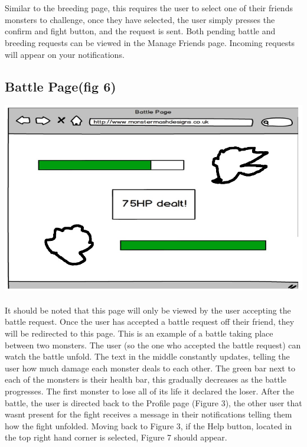 \documentclass{project}
\begin{document}
\\
\\
Similar to the breeding page, this requires the user to select one of their friends
monsters to challenge, once they have selected, the user simply presses the confirm
and fight button, and the request is sent.
Both pending battle and breeding requests can be viewed in the Manage Friends
page. Incoming requests will appear on your notifications.

\subsection{Battle Page(fig 6)}
\includegraphics[scale=0.5]{battle.jpg}
\\
\\
It should be noted that this page will only be viewed by the user accepting the battle
request. Once the user has accepted a battle request off their friend, they will be
redirected to this page.
This is an example of a battle taking place between two monsters. The user (so
the one who accepted the battle request) can watch the battle unfold. The text
in the middle constantly updates, telling the user how much damage each monster
deals to each other. The green bar next to each of the monsters is their health bar,
this gradually decreases as the battle progresses. The first monster to lose all of its
life it declared the loser. After the battle, the user is directed back to the Profile
page (Figure 3), the other user that wasnt present for the fight receives a message
in their notifications telling them how the fight unfolded.
Moving back to Figure 3, if the Help button, located in the top right hand corner
is selected, Figure 7 should appear.
\end{document}
